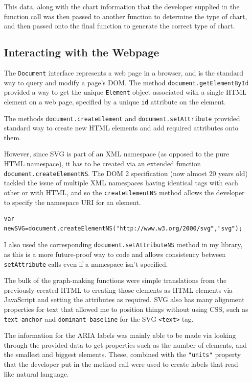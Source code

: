 \documentclass[ %
                    author={Aleena Baig},
                supervisor={Dr Simon Lock},
                    degree={BSc},
                     title={On Making Web Accessible Graphs},
                  subtitle={},
                      year={2019} ]{dissertation}
\begin{document}
This data, along with the chart information that the developer supplied in the function call was then passed to another function to determine the type of chart, and then passed onto the final function to generate the correct type of chart.

\subsection{Interacting with the Webpage}

The \texttt{Document} interface represents a web page in a browser, and is the standard way to query and modify a page's DOM. The method \texttt{document.getElementById} provided a way to get the unique \texttt{Element} object associated with a single HTML element on a web page, specified by a unique \texttt{id} attribute on the element.


The methods \texttt{document.createElement} and \texttt{document.setAttribute} provided standard way to create new HTML elements and add required attributes onto them.

However, since SVG is part of an XML namespace (as opposed to the pure HTML namespace), it has to be created via an extended function \texttt{document.createElementNS}. The DOM 2 specification (now almost 20 years old) tackled the issue of multiple XML namespaces having identical tags with each other or with HTML, and so the \texttt{createElementNS} method allows the developer to specify the namespace URI for an element.

\begin{lstlisting}
var newSVG=document.createElementNS("http://www.w3.org/2000/svg","svg");
\end{lstlisting}

I also used the corresponding \texttt{document.setAttributeNS} method in my library, as this is a more future-proof way to code and allows consistency between \texttt{setAttribute} calls even if a namespace isn't specified.

The bulk of the graph-making functions were simple translations from the previously-created HTML to creating those elements as HTML elements via JavaScript and setting the attributes as required. SVG also has many alignment properties for text that allowed me to position things without using CSS, such as \texttt{text-anchor} and \texttt{dominant-baseline} for the SVG \texttt{<text>} tag.

The information for the ARIA labels was mainly able to be made via looking through the provided data to get properties such as the number of elements, and the smallest and biggest elements. These, combined with the \texttt{"units"} property that the developer put in the method call were used to create labels that read like natural language.
\end{document}
